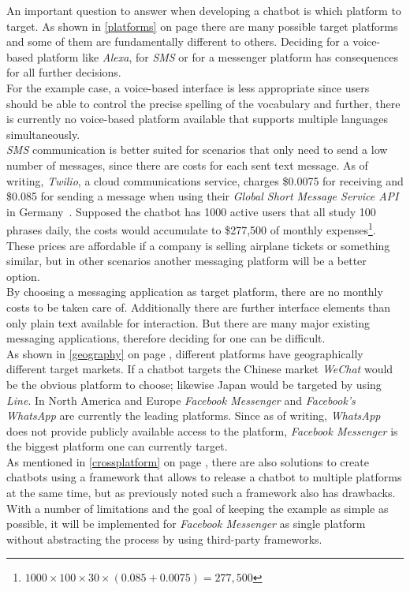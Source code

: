 An important question to answer when developing a chatbot is which platform to target.
As shown in \ref{platforms} on page \pageref{platforms} there are many possible target platforms
and some of them are fundamentally different to others.
Deciding for a voice-based platform like \emph{Alexa}, for \emph{SMS} or for a messenger platform has consequences
for all further decisions.
\\
For the example case, a voice-based interface is less appropriate since
users should be able to control the precise spelling of the vocabulary
and further, there is currently no voice-based platform available
that supports multiple languages simultaneously.
\\
\emph{SMS} communication is better suited for scenarios that only need to send a low number of messages,
since there are costs for each sent text message.
As of writing, \emph{Twilio}, a cloud communications service, charges \$0.0075 for receiving and \$0.085 for sending a message when using their \emph{Global Short Message Service API} in Germany~\cite{twilio}.
Supposed the chatbot has 1000 active users that all study 100 phrases daily,
the costs would accumulate to \$277,500 of monthly expenses\footnote{$1000\times100\times30\times(0.085+0.0075)=277,500$}.
These prices are affordable if a company is selling airplane tickets or something similar,
but in other scenarios another messaging platform will be a better option.
\\
By choosing a messaging application as target platform, there are no monthly costs to be taken care of.
Additionally there are further interface elements than only plain text available for interaction.
But there are many major existing messaging applications, therefore deciding for one can be difficult.
\\
As shown in \ref{geography} on page \pageref{geography}, different platforms have geographically different target markets.
If a chatbot targets the Chinese market \emph{WeChat} would be the obvious platform to choose;
likewise Japan would be targeted by using\emph{ Line}.
In North America and Europe \emph{Facebook Messenger} and \emph{Facebook's WhatsApp} are currently the leading platforms.
Since as of writing, \emph{WhatsApp} does not provide publicly available access to the platform,
\emph{Facebook Messenger} is the biggest platform one can currently target.
\\
As mentioned in \ref{crossplatform} on page \pageref{crossplatform},
there are also solutions to create chatbots using a framework that allows to release a chatbot to multiple platforms at the same time,
but as previously noted such a framework also has drawbacks.
\\
With a number of limitations and the goal of keeping the example as simple as possible,
it will be implemented for \emph{Facebook Messenger} as single platform without abstracting the process by using third-party frameworks.
\\

